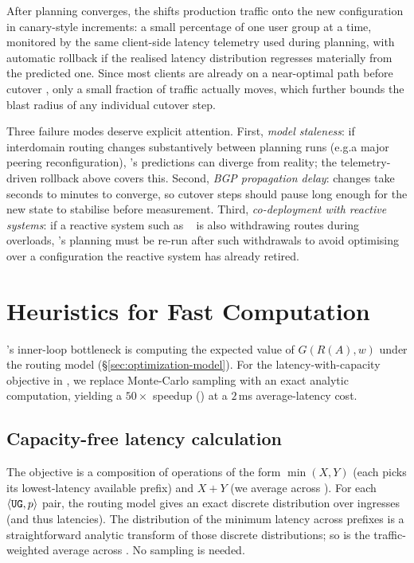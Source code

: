 \documentclass[acmsmall,anonymous,review,nonacm,10pt]{acmart}
\begin{document}
  After planning converges, the \servprod
shifts production traffic onto the new configuration in
canary-style increments: a small percentage of one user group at a
time, monitored by the same client-side latency telemetry used
during planning, with automatic rollback if the realised latency
distribution regresses materially from the predicted one.  Since
most clients are already on a near-optimal path before cutover
\cite{whyhigh,calder2015analyzing,anyopt,painter}, only a small
fraction of traffic actually moves, which further bounds the
blast radius of any individual cutover step.

  Three failure modes deserve explicit
attention.  First, \emph{model staleness}: if interdomain routing
changes substantively between planning runs (e.g.\@ a major
peering reconfiguration), \sparse's predictions can diverge from
reality; the telemetry-driven rollback above covers this.
Second, \emph{BGP propagation delay}: changes take seconds to
minutes to converge, so cutover steps should pause long enough
for the new state to stabilise before measurement.  Third,
\emph{co-deployment with reactive systems}: if a reactive system
such as \tipsy~\cite{tipsy} is also withdrawing routes during
overloads, \sparse's planning must be re-run after such
withdrawals to avoid optimising over a configuration the
reactive system has already retired.

\section{Heuristics for Fast Computation}
\label{ap:heuristics}

\sparse's inner-loop bottleneck is computing the expected value of
$G(R(A),w)$ under the routing model
(\S\ref{sec:optimization-model}).  For the latency-with-capacity
objective in , we replace Monte-Carlo
sampling with an exact analytic computation, yielding a $50\times$
speedup () at a $2$\,ms
average-latency cost.

\subsection{Capacity-free \ug latency calculation}
\label{ap:heuristics-capacity-free}
The objective is a composition of operations of the form
$\min(X,Y)$ (each \ug picks its lowest-latency available prefix)
and $X+Y$ (we average across \ugs).  For each $\langle\texttt{UG},
p\rangle$ pair, the routing model gives an exact discrete
distribution over ingresses (and thus latencies).  The
distribution of the minimum latency across prefixes is a
straightforward analytic transform of those discrete distributions;
so is the traffic-weighted average across \ugs.  No sampling
is needed.
\end{document}
